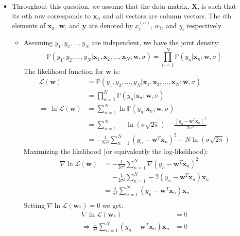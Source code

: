 \documentclass{article}
\newcommand{\mathbi}[1]{\boldsymbol{#1}}
\begin{document}
\begin{itemize}
    \item[\textbf{2.2}] Throughout this question, we assume that the data matrix, $\mathbi{X}$, is such that its $n$th row corresponds to $\mathbi{x}_n$ and all vectors are column vectors.
    The $i$th elements of $\mathbi{x}_n$, $\mathbi{w}$, and $\mathbi{y}$ are denoted by $x_i^{(n)}$, $w_i$, and $y_i$ respectively.
    \begin{itemize}
      \item[1.] Assuming $y_1, y_2, \dots, y_N$ are independent, we have the joint density:
      \[ \mathbb{P}(y_1, y_2, \dots, y_N | \mathbi{x}_1, \mathbi{x}_2, \dots, \mathbi{x}_N; \mathbi{w}, \sigma) = \prod_{n=1}^{N} \mathbb{P}(y_n | \mathbi{x}_n; \mathbi{w}, \sigma) \]
      The likelihood function for $\mathbi{w}$ is:
      \begin{align*}
        \mathcal{L}(\mathbi{w}) &= \mathbb{P}(y_1, y_2, \dots, y_N | \mathbi{x}_1, \mathbi{x}_2, \dots, \mathbi{x}_N; \mathbi{w}, \sigma) \\
        &= \prod_{n=1}^{N} \mathbb{P}(y_n | \mathbi{x}_n; \mathbi{w}, \sigma) \\
        \Rightarrow \ln \mathcal{L}(\mathbi{w}) &= \sum_{n=1}^{N} \ln \mathbb{P}(y_n | \mathbi{x}_n; \mathbi{w}, \sigma) \\
        &= \sum_{n=1}^{N} -\ln(\sigma \sqrt{2\pi}) - \frac{(y_n - \mathbi{w}^T \mathbi{x}_n)^2}{2 \sigma^2} \\
        &= - \frac{1}{2 \sigma^2} \sum_{n=1}^{N} (y_n - \mathbi{w}^T \mathbi{x}_n)^2 - N \ln(\sigma \sqrt{2\pi})
      \end{align*}
      Maximizing the likelihood (or equivalently the log-likelihood):
      \begin{align*}
        \nabla \ln \mathcal{L}(\mathbi{w}) &= - \frac{1}{2 \sigma^2} \sum_{n=1}^{N} \nabla (y_n - \mathbi{w}^T \mathbi{x}_n)^2 \\
        &= - \frac{1}{2 \sigma^2} \sum_{n=1}^{N} -2 (y_n - \mathbi{w}^T \mathbi{x}_n) \mathbi{x}_n \\
        &= \frac{1}{\sigma^2} \sum_{n=1}^{N} (y_n - \mathbi{w}^T \mathbi{x}_n) \mathbi{x}_n \\
      \end{align*}
      \vspace{-\baselineskip}
      Setting $\nabla \ln \mathcal{L}(\mathbi{w}_*) = 0$ we get:
      \begin{align*}
        \nabla \ln \mathcal{L}(\mathbi{w}_*) &= 0 \\
        \Rightarrow \frac{1}{\sigma^2} \sum_{n=1}^{N} (y_n - \mathbi{w}^T \mathbi{x}_n) \mathbi{x}_n  &= 0 \\

\end{align*}
\end{itemize}
\end{itemize}
\end{document}
